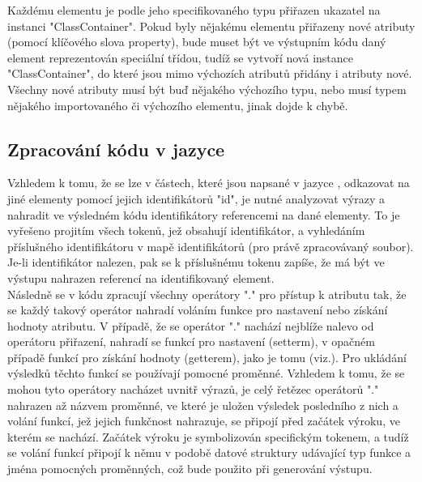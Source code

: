 \documentclass[11pt,twoside,a4paper]{book}
\begin{document}
{{\begin{ttemize}
{{\begin{lastlisting}[frame=single,caption=Řešení v pseudokódu problematického použití operátoru "." v přiřazovacím výroku,label=lst:var0N]
Každému elementu je podle jeho specifikovaného typu přiřazen ukazatel na instanci "ClassContainer". Pokud byly nějakému elementu přiřazeny nové atributy (pomocí klíčového slova property), bude muset být ve výstupním kódu daný element reprezentován speciální třídou, tudíž se vytvoří nová instance "ClassContainer", do které jsou mimo výchozích atributů přidány i atributy nové. Všechny nové atributy musí být buď nějakého výchozího typu, nebo musí typem nějakého importovaného či výchozího elementu, jinak dojde k chybě.

\subsection{Zpracování kódu v jazyce }
Vzhledem k tomu, že se lze v částech, které jsou napsané v jazyce , odkazovat na jiné elementy pomocí jejich identifikátorů "id", je nutné analyzovat výrazy a nahradit ve výsledném kódu identifikátory referencemi na dané elementy. To je vyřešeno projitím všech tokenů, jež obsahují identifikátor, a vyhledáním příslušného identifikátoru v mapě identifikátorů (pro právě zpracovávaný soubor). Je-li identifikátor nalezen, pak se k příslušnému tokenu zapíše, že má být ve výstupu nahrazen referencí na identifikovaný element.\\
Následně se v kódu zpracují všechny operátory "." pro přístup k atributu tak, že se každý takový operátor nahradí voláním funkce pro nastavení nebo získání hodnoty atributu. V případě, že se operátor "." nachází nejblíže nalevo od operátoru přiřazení, nahradí se funkcí pro nastavení (setterm), v opačném případě funkcí pro získání hodnoty (getterem), jako je tomu (viz.). Pro ukládání výsledků těchto funkcí se používají pomocné proměnné. Vzhledem k tomu, že se mohou tyto operátory nacházet uvnitř výrazů, je celý řetězec operátorů "." nahrazen až názvem proměnné, ve které je uložen výsledek posledního z nich a volání funkcí, jež jejich funkčnost nahrazuje, se připojí před začátek výroku, ve kterém se nachází. Začátek výroku je symbolizován specifickým tokenem, a tudíž se volání funkcí připojí k němu v podobě datové struktury udávající typ funkce a jména pomocných proměnných, což bude použito při generování výstupu.



\end{lastlisting}}}
\end{ttemize}}}
\end{document}
